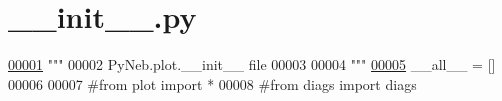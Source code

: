 \hypertarget{plot_2____init_____8py_source}{}\section{\+\_\+\+\_\+init\+\_\+\+\_\+.\+py}
\label{plot_2____init_____8py_source}

\begin{DoxyCode}
\hypertarget{plot_2____init_____8py_source_l00001}{}\hyperlink{namespacepyneb_1_1plot}{00001} \textcolor{stringliteral}{"""}
00002 \textcolor{stringliteral}{PyNeb.plot.\_\_init\_\_ file}
00003 \textcolor{stringliteral}{}
00004 \textcolor{stringliteral}{"""}
\hypertarget{plot_2____init_____8py_source_l00005}{}\hyperlink{namespacepyneb_1_1plot_a66a8860c2cc0db67a520645120e8bc7b}{00005} \_\_all\_\_ = []
00006 
00007 \textcolor{comment}{#from plot import *}
00008 \textcolor{comment}{#from diags import diags}
\end{DoxyCode}

